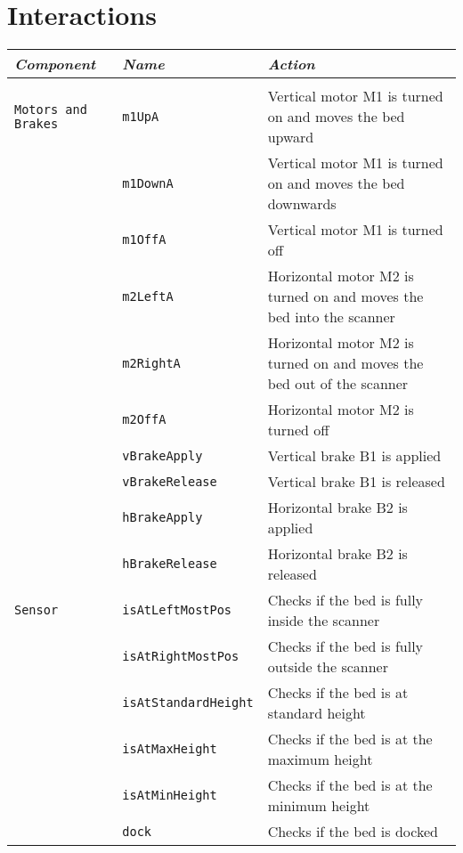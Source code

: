 \label{task2}
\section{Interactions}

\begin{table}
\begin{tabular}{l|ll}
\hline 
\textit{Component} & \textit{Name} & \textit{Action} \\
\hline \\
\verb$Motors and Brakes$ & \verb$m1UpA$ & Vertical motor M1 is turned on and moves the bed upward\\
 & \verb$m1DownA$ & Vertical motor M1 is turned on and moves the bed downwards\\
 & \verb$m1OffA$ & Vertical motor M1 is turned off\\
 & \verb$m2LeftA$ & Horizontal motor M2 is turned on and moves the bed into the scanner\\
 & \verb$m2RightA$ & Horizontal motor M2 is turned on and moves the bed out of the scanner\\
 & \verb$m2OffA$ & Horizontal motor M2 is turned off \\
 & \verb$vBrakeApply$ & Vertical brake B1 is applied\\
 & \verb$vBrakeRelease$ & Vertical brake B1 is released\\
 & \verb$hBrakeApply$ & Horizontal brake B2 is applied\\
 & \verb$hBrakeRelease$ & Horizontal brake B2 is released\\
 \hline 
 
 \verb$Sensor$ &  \verb$isAtLeftMostPos$ & Checks if the bed is fully inside the scanner\\
 & \verb$isAtRightMostPos$ & Checks if the bed is fully outside the scanner\\
 & \verb$isAtStandardHeight$ & Checks if the bed is at standard height \\
 & \verb$isAtMaxHeight$ & Checks if the bed is at the maximum height \\
 & \verb$isAtMinHeight$ & Checks if the bed is at the minimum height\\
 & \verb$dock$ & Checks if the bed is docked\\
 \hline
 

\end{tabular}
\end{table}
